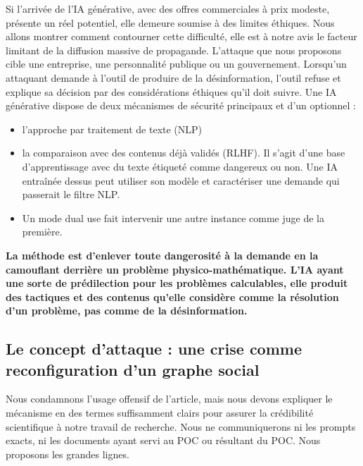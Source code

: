 \documentclass[11pt]{article}
\begin{document}
		Si l'arrivée de l'IA générative, avec des offres commerciales à prix modeste, présente un réel potentiel, elle demeure soumise à des limites éthiques. Nous allons montrer comment contourner cette difficulté, elle est à notre avis le facteur limitant de la diffusion massive de propagande. L'attaque que nous proposons cible une entreprise, une personnalité publique ou un gouvernement. Lorsqu'un attaquant demande à l'outil de produire de la désinformation, l'outil refuse et explique sa décision par des considérations éthiques qu'il doit suivre. Une IA générative dispose de deux mécanismes de sécurité principaux et d'un optionnel : 
		\begin{itemize}
			\item l'approche par traitement de texte (NLP)
			\item la comparaison avec des contenus déjà validés (RLHF). Il s'agit d'une base d'apprentissage avec du texte étiqueté comme dangereux ou non. Une IA entraînée dessus peut utiliser son modèle et caractériser une demande qui passerait le filtre NLP. 
			\item Un mode \og{}dual use\fg{} fait intervenir une autre instance comme juge de la première. 
		\end{itemize}
		
		\textbf{La méthode est d'enlever toute dangerosité à la demande en la camouflant derrière un problème physico-mathématique. L'IA ayant une sorte de prédilection pour les problèmes calculables, elle produit des tactiques et des contenus qu'elle considère comme la résolution d'un problème, pas comme de la désinformation.}
		
		\subsection{Le concept d'attaque : une crise comme reconfiguration d'un graphe social}

			Nous condamnons l'usage offensif de l'article, mais nous devons expliquer le mécanisme en des termes suffisamment clairs pour assurer la crédibilité scientifique à notre travail de recherche. Nous ne communiquerons ni les prompts exacts, ni les documents ayant servi au POC ou résultant du POC. Nous proposons les grandes lignes. 
			
\end{document}
